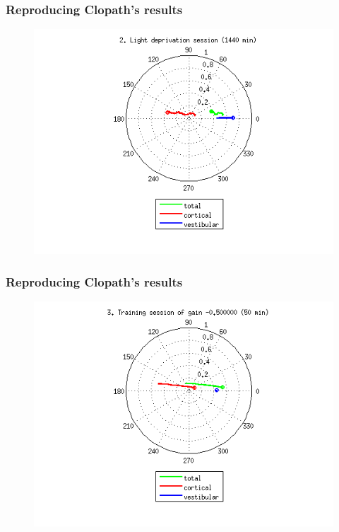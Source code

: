 \documentclass[10pt, compress]{beamer}
\begin{document}
\begin{frame}[fragile]
  \frametitle{Reproducing Clopath's results}
  \begin{figure}
    \includegraphics[scale=0.5]{images/longnoi_20.png}
  \end{figure}
\end{frame}

\begin{frame}[fragile]
  \frametitle{Reproducing Clopath's results}
  \begin{figure}
    \includegraphics[scale=0.5]{images/longnoi_21.png}
  \end{figure}
\end{frame}
\end{document}
